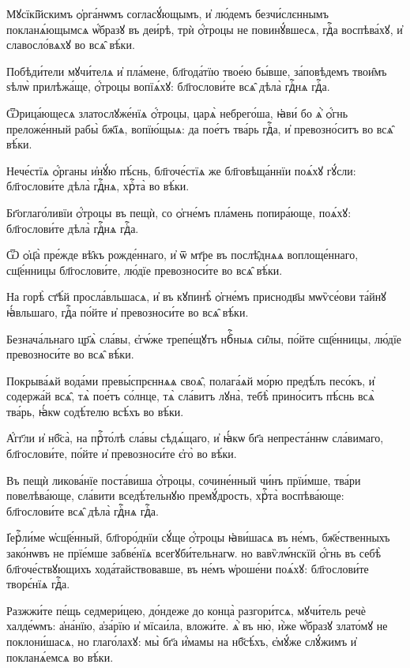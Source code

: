 \hKv Мꙋсїкі̑йскимъ ѻ҆рга́нѡмъ согласꙋ́ющымъ, и҆ лю́демъ  безчи́слєннымъ покланѧ́ющымсѧ ѡ҆́бразꙋ въ деи́рѣ, трѝ  ѻ҆́троцы не повинꙋ́вшесѧ, гдⷭ҇а воспѣва́хꙋ, и҆  славосло́вѧхꙋ во всѧ̑ вѣ́ки. 

\hKv Побѣди́тели мꙋчи́телѧ и҆ пла́мене, бл҃года́тїю твое́ю  бы́вше, за́повѣдемъ твои̑мъ ѕѣлѡ̀ прилѣжа́ще, ѻ҆́троцы  вопїѧ́хꙋ: бл҃гослови́те всѧ̑ дѣла̀ гдⷭ҇нѧ гдⷭ҇а. 

\hKv Ѿрица́ющесѧ златослꙋже́нїѧ ѻ҆́троцы, царѧ̀ небрего́ша,  ꙗ҆ви́ бо ѧ҆̀ ѻ҆́гнь преложе́нный рабы̀ бж҃їѧ, вопїю́щыѧ:  да пое́тъ тва́рь гдⷭ҇а, и҆ превозно́ситъ во всѧ̑ вѣ́ки.  

\hKv Нече́стїѧ ѻ҆́рганы и҆нꙋ́ю пѣ́снь, бл҃гоче́стїѧ же  бл҃говѣща́ннїи поѧ́хꙋ гꙋ́сли: бл҃гослови́те дѣла̀ гдⷭ҇нѧ,  хрⷭ҇та̀ во вѣ́ки. 

\hKv Бг҃оглаго́ливїи ѻ҆́троцы въ пещѝ, со ѻ҆гне́мъ пла́мень  попира́юще, поѧ́хꙋ: бл҃гослови́те дѣла̀ гдⷭ҇нѧ гдⷭ҇а. 

\hKv Ѿ ѻ҆ц҃а̀ пре́жде вѣ̑къ рожде́ннаго, и҆ ѿ мт҃ре въ  послѣ̑днѧѧ воплоще́ннаго, сщ҃е́нницы бл҃гослови́те, лю́дїе  превозноси́те во всѧ̑ вѣ́ки. 

\hKv На горѣ̀ ст҃ѣ́й просла́вльшасѧ, и҆ въ кꙋпинѣ̀ ѻ҆гне́мъ  приснодв҃ы мѡѷсе́ови та́йнꙋ ꙗ҆́вльшаго, гдⷭ҇а по́йте и҆  превозноси́те во всѧ̑ вѣ́ки. 

\hKv Безнача́льнаго цр҃ѧ̀ сла́вы, є҆гѡ́же трепе́щꙋтъ нбⷭ҇ныѧ  си̑лы, по́йте сщ҃е́нницы, лю́дїе превозноси́те во всѧ̑  вѣ́ки.  
%

\hKv Покрыва́ѧй вода́ми превы́спрєннѧѧ  своѧ̑, полага́ѧй мо́рю предѣ́лъ песо́къ, и҆ содержа́й всѧ̑,  тѧ̀ пое́тъ со́лнце,  тѧ̀ сла́витъ  лꙋна̀, тебѣ̀ прино́ситъ пѣ́снь всѧ̀ тва́рь, ꙗ҆́кѡ  содѣ́телю всѣ́хъ во вѣ́ки. 
%

\hKv А҆́гг҃ли и҆ нб҃са̀, на прⷭ҇то́лѣ сла́вы  сѣдѧ́щаго, и҆ ꙗ҆́кѡ бг҃а непреста́ннѡ сла́вимаго,  бл҃гослови́те, по́йте и҆ превозноси́те є҆го̀ во вѣ́ки. 

\hKv Въ пещѝ ликова́нїе поста́виша ѻ҆́троцы, сочине́нный чи́нъ  прїи́мше, тва́ри повелѣва́юще, сла́вити вседѣ́тельнꙋю  премꙋ́дрость, хрⷭ҇та̀ воспѣва́юще: бл҃гослови́те всѧ̑  дѣла̀ гдⷭ҇нѧ гдⷭ҇а. 

\hKv І҆ерⷭ҇ли́ме ѡ҆сщ҃е́нный, бл҃горо́днїи сꙋ́ще ѻ҆́троцы  ꙗ҆ви́шасѧ въ не́мъ, бж҃е́ственныхъ зако́нѡвъ не прїе́мше  забве́нїѧ всегꙋби́тельнагѡ. но вавѷлѡ́нскїй ѻ҆́гнь въ  себѣ̀ бл҃гоче́ствꙋющихъ хода́тайствовавше, въ не́мъ  ѡ҆роше́ни поѧ́хꙋ: бл҃гослови́те творє́нїѧ гдⷭ҇а. 

\hKv Разжжи́те пе́щь седмери́цею, до́ндеже до конца̀ разгори́тсѧ,  мꙋчи́тель речѐ халде́ѡмъ: а҆на́нїю, а҆за́рїю и҆ мїсаи́ла,  вложи́те. ѧ҆̀ въ ню̀,  и҆̀же  ѡ҆́бразꙋ злато́мꙋ не поклони́шасѧ, но глаго́лахꙋ: мы̀ бг҃а  и҆́мамы на нб҃сѣ́хъ, є҆мꙋ́же слꙋ́жимъ и҆ покланѧ́емсѧ во  вѣ́ки.  

